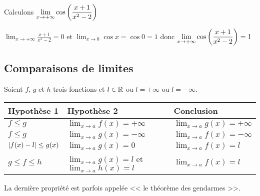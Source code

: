 \begin{example}
 Calculons $\displaystyle \lim_{x \to +\infty} \cos\left(\frac{x+1}{x^{2}-2}\right)$ 
 
 $\displaystyle \lim_{x \to +\infty} \frac{x+1}{x^{2}-2} = 0 $ et $ \displaystyle \lim_{x \to 0} \cos x = \cos0=1 $ donc $  \displaystyle\lim_{x \to +\infty}\cos\left(\frac{x+1}{x^{2}-2}\right)=1 $

\end{example}  

 \subsection{Comparaisons de limites}

Soient $f $, $g$ et $h$ trois fonctions et $ l\in\mathbb{R}$ ou $ l= +\infty $ ou $ l=-\infty $.


\begin{tabularx}{\textwidth}{|X|X|X|}
\hline
\textbf{ Hypothèse 1}  & \textbf{Hypothèse 2} & \textbf{ Conclusion }\\
\hline
$ f\leq g $  & $ \displaystyle \lim_{x \to a}f(x)=+\infty $ & $\displaystyle \lim_{x \to a}g(x)=+\infty $ \\
 \hline
 $ f\leq g $  & $\displaystyle \lim_{x \to a}g(x)=-\infty $ & $ \displaystyle \lim_{x \to a}f(x)=-\infty $    \\
\hline
$ \left\lvert f(x)-l  \right\rvert\leq g(x) $ & $\displaystyle \lim_{x \to a}g(x)=0$ & $ \displaystyle \lim_{x \to a}f(x)=l  $ \\
\hline
$ g \leq f \leq h $ & $ \displaystyle \lim_{x \to a}g(x)=l $ et $ \displaystyle \lim_{x \to a}h(x)=l $ & $ \displaystyle \lim_{x \to a}f(x)=l $    \\
\hline
\end{tabularx}


\begin{remark}
 
La dernière propriété est parfois appelée << le théorème des gendarmes >>.
 \end{remark}

